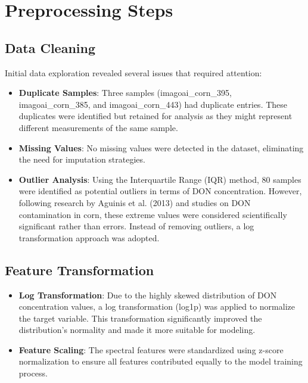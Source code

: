\documentclass{article}
\begin{document}
\section{Preprocessing Steps}
\subsection{Data Cleaning}
Initial data exploration revealed several issues that required attention:

\begin{itemize}
    \item \textbf{Duplicate Samples}: Three samples (imagoai\_corn\_395, imagoai\_corn\_385, and imagoai\_corn\_443) had duplicate entries. These duplicates were identified but retained for analysis as they might represent different measurements of the same sample.
    
    \item \textbf{Missing Values}: No missing values were detected in the dataset, eliminating the need for imputation strategies.
    
    \item \textbf{Outlier Analysis}: Using the Interquartile Range (IQR) method, 80 samples were identified as potential outliers in terms of DON concentration. However, following research by Aguinis et al. (2013) and studies on DON contamination in corn, these extreme values were considered scientifically significant rather than errors. Instead of removing outliers, a log transformation approach was adopted.
\end{itemize}

\subsection{Feature Transformation}
\begin{itemize}
    \item \textbf{Log Transformation}: Due to the highly skewed distribution of DON concentration values, a log transformation (log1p) was applied to normalize the target variable. This transformation significantly improved the distribution's normality and made it more suitable for modeling.
    
    \item \textbf{Feature Scaling}: The spectral features were standardized using z-score normalization to ensure all features contributed equally to the model training process.
\end{itemize}
\end{document}
